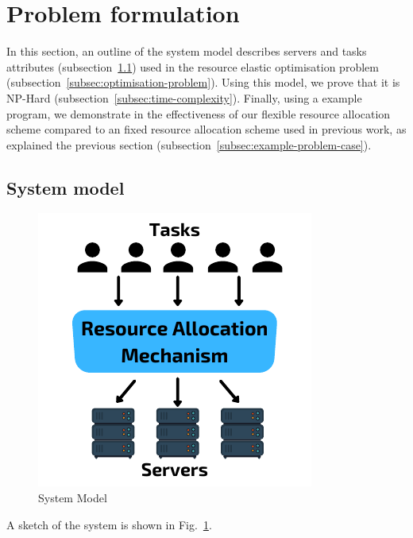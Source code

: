 \section{Problem formulation}
\label{sec:problem-formulation}
In this section, an outline of the system model describes servers and tasks attributes
(subsection~\ref{subsec:system-model}) used in the resource elastic optimisation problem
(subsection~\ref{subsec:optimisation-problem}). Using this model, we prove that it is NP-Hard
(subsection~\ref{subsec:time-complexity}). Finally, using a example program, we demonstrate in the effectiveness of our
flexible resource allocation scheme compared to an fixed resource allocation scheme used in previous work, as explained
the previous section (subsection~\ref{subsec:example-problem-case}).

\subsection{System model}\label{subsec:system-model}
\begin{figure}
    \centering
    \includegraphics[width=\linewidth]{figs/system_model.pdf}
    \caption{System Model}
    \label{fig:system-model}
\end{figure}
A sketch of the system is shown in Fig.~\ref{fig:system-model}.
